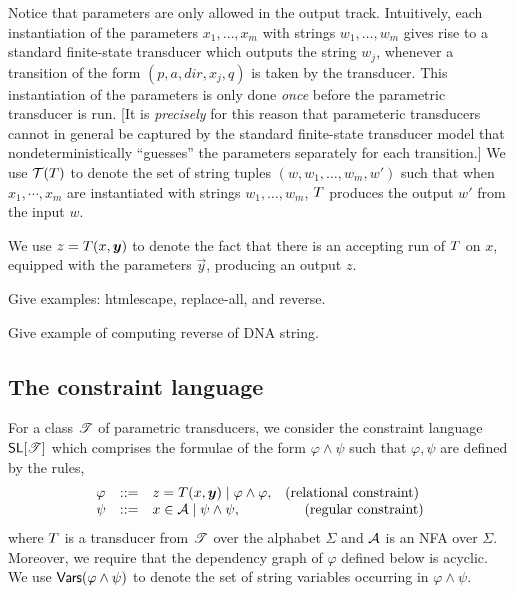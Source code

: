 Notice that parameters are only allowed in the output track.
Intuitively, each instantiation of the parameters $x_1,\ldots,x_m$ with strings 
$w_1,\ldots, w_m$ gives rise to a standard finite-state transducer which outputs
the string $w_j$, whenever a transition of the form $(p, a, dir, x_j, q)$ is
taken by the transducer. This instantiation of the parameters is only done 
\emph{once} before the parametric transducer is run. [It is \emph{precisely}
for this reason that parameteric transducers cannot in general be captured by 
the standard finite-state transducer model that nondeterministically ``guesses''
the parameters separately for each transition.]  We use $\mathcal{T}(T)$ to denote the set of string tuples $(w, w_1, \ldots, w_m, w')$ such that when $x_1,\cdots, x_m$ are instantiated with strings $w_1,\ldots, w_m$, $T$ produces the output $w'$ from the input $w$. 

We use $z = \Transducer(x, \vec{y})$ to denote the fact that there is an accepting run of $T$ on $x$, equipped with the parameters $\vec{y}$, producing an output $z$.


Give examples: htmlescape, replace-all, and reverse.

Give example of computing reverse of DNA string.

\subsection{The constraint language}
For a class $\mathscr{T}$ of parametric transducers, we consider the constraint language $\textsf{SL}[\mathscr{T}]$ which comprises the formulae of the form $\varphi \wedge \psi$ such that $\varphi,\psi$ are defined by the rules,
\[
\begin{array}{l l l r}
\varphi &::=& z = \Transducer(x, \vec{y}) \mid \varphi \wedge \varphi, &  \hfill  \mbox{(relational constraint) } \\ 
\psi &::= & x \in \Aut \mid \psi \wedge \psi, & \hfill \mbox{(regular constraint)} 
\end{array}
\]
where $T$ is a transducer from $\mathscr{T}$ over the alphabet $\Sigma$ and $\mathcal{A}$ is an NFA over $\Sigma$. Moreover, we require that the dependency graph of $\varphi$ defined below is acyclic. We use $\mathsf{Vars}(\varphi \wedge \psi)$ to denote the set of string variables occurring in $\varphi \wedge \psi$.

